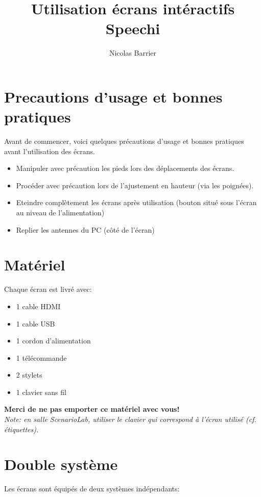 \documentclass[10pt]{article}
\title{Utilisation écrans intéractifs Speechi}
\author{Nicolas Barrier}
\begin{document}
\maketitle
\tableofcontents
\section{Precautions d'usage et bonnes pratiques}

Avant de commencer, voici quelques précautions d'usage et bonnes pratiques avant l'utilisation des écrans.

\begin{itemize}
\item Manipuler avec précaution les pieds lors des déplacements des écrans.
\item Procéder avec précaution lors de l'ajustement en hauteur (via les poignées).
\item Eteindre complètement les écrans après utilisation (bouton situé sous l'écran au niveau de l'alimentation)
\item Replier les antennes du PC (côté de l'écran)
\end{itemize}

\section{Matériel}

Chaque écran est livré avec:

\begin{itemize}
\item 1 cable HDMI
\item 1 cable USB
\item 1 cordon d’alimentation
\item 1 télécommande
\item 2 stylets
\item 1 clavier sans fil
\end{itemize}

\textbf{Merci de ne pas emporter ce matériel avec vous!}\\ 

\emph{Note: en salle ScenarioLab, utiliser le clavier qui correspond à l'écran utilisé (cf. étiquettes).}

\section{Double système}

Les écrans sont équipés de deux systèmes indépendants:
\end{document}

